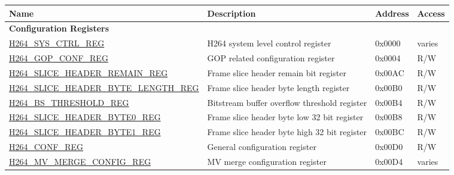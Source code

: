 \begin{longtable}{ | p{7cm} | p{6.2cm} | p{1.2cm} | p{1cm} | }
\hline\rowcolor{lightgray}
{\bfseries Name} & {\bfseries Description} &  {\bfseries Address} & {\bfseries Access} \\ \hline
\endhead
\multicolumn{4}{|l|}{\textbf{Configuration Registers}} \\ \hline
\hyperref[regdesc:H264SYSCTRLREG]{H264\_SYS\_CTRL\_REG} & H264 system level control register & 0x0000 & varies \\ \hline
\hyperref[regdesc:H264GOPCONFREG]{H264\_GOP\_CONF\_REG} & GOP related configuration register & 0x0004 & R/W \\ \hline
\hyperref[regdesc:H264SLICEHEADERREMAINREG]{H264\_SLICE\_HEADER\_REMAIN\_REG} & Frame slice header remain bit register & 0x00AC & R/W \\ \hline
\hyperref[regdesc:H264SLICEHEADERBYTELENGTHREG]{H264\_SLICE\_HEADER\_BYTE\_LENGTH\_REG} & Frame slice header byte length register & 0x00B0 & R/W \\ \hline
\hyperref[regdesc:H264BSTHRESHOLDREG]{H264\_BS\_THRESHOLD\_REG} & Bitstream buffer overflow threshold register & 0x00B4 & R/W \\ \hline
\hyperref[regdesc:H264SLICEHEADERBYTE0REG]{H264\_SLICE\_HEADER\_BYTE0\_REG} & Frame slice header byte low 32 bit  register & 0x00B8 & R/W \\ \hline
\hyperref[regdesc:H264SLICEHEADERBYTE1REG]{H264\_SLICE\_HEADER\_BYTE1\_REG} & Frame slice header byte high 32 bit  register & 0x00BC & R/W \\ \hline
\hyperref[regdesc:H264CONFREG]{H264\_CONF\_REG} & General configuration register & 0x00D0 & R/W \\ \hline
\hyperref[regdesc:H264MVMERGECONFIGREG]{H264\_MV\_MERGE\_CONFIG\_REG} & MV merge configuration register & 0x00D4 & varies \\ \hline


\end{longtable}
